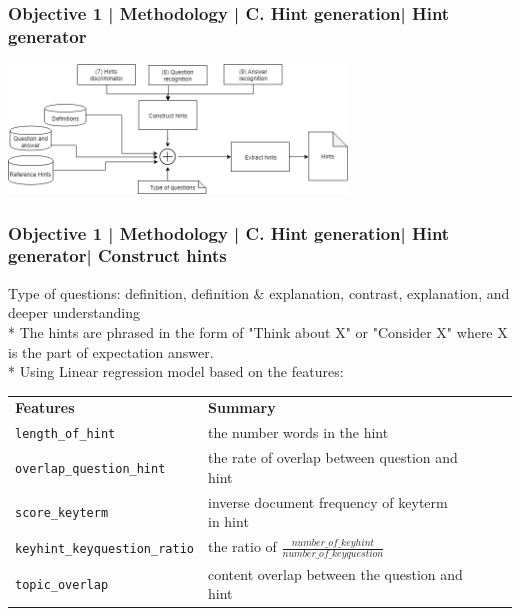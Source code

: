 \documentclass{beamer}
\newcommand{\code}[1]{{\texttt{#1}}}
\begin{document}
\begin{frame}
\frametitle{Objective 1 | Methodology | C. Hint generation| Hint generator}
	\includegraphics[width=90mm]{ht3.png}
\end{frame}
\begin{frame}
\frametitle{Objective 1 | Methodology | C. Hint generation| Hint generator| Construct hints}
{\small * Type of questions: definition, definition \& explanation, contrast, explanation, and deeper understanding\\
* The hints are phrased in the form of "Think about X" or "Consider X" where X is the part of expectation answer. \\
* Using Linear regression model based on the features: }
{\tiny \begin{table}[]
	\begin{tabular}{|l|l|lll}
		\cline{1-2}
		\textbf{Features}             & \textbf{Summary}              &  &  &  \\ \cline{1-2}
		\code{length\_of\_hint}  & the number words in the hint     &  &  &  \\ \cline{1-2}
		\code{overlap\_question\_hint} & the rate of overlap between question and hint &  &  &  \\ \cline{1-2}
		\code{score\_keyterm}          & inverse document frequency of keyterm in hint          & &  &  \\ \cline{1-2}
		\code{keyhint\_keyquestion\_ratio}          & the ratio of $\frac{number\_of\_keyhint}{number\_of\_keyquestion}$     &  &  &  \\ \cline{1-2}
		\code{topic\_overlap}          & content overlap between the question and hint     &  &  &  \\ \cline{1-2}
		

\end{tabular}
\end{table}}
\end{frame}
\end{document}
